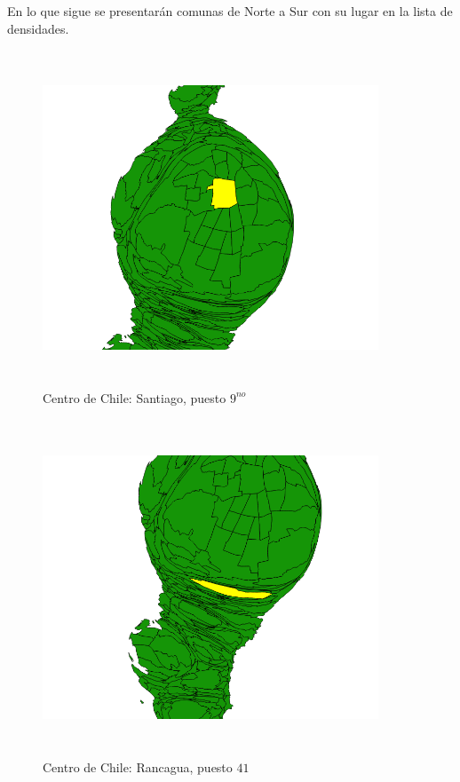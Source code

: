 \documentclass[20pt]{report}
\begin{document}
\begin{itemize}
En lo que sigue se presentar\'an comunas de Norte a Sur con su lugar en la lista de densidades.

\begin{figure}[H]
\begin{center}
\includegraphics[width=10cm, height=10cm]{santiago9.png}
\vspace{-0.5cm} %
\caption{Centro de Chile: Santiago, puesto $9^{no}$}
\label{Label para referencia}
\end{center}
\end{figure}

\begin{figure}[H]
\begin{center}
\includegraphics[width=10cm, height=10cm]{rancagua.png}
\vspace{-0.5cm} %
\caption{Centro de Chile: Rancagua, puesto $41$}
\label{Label para referencia}
\end{center}
\end{figure}


\end{itemize}
\end{document}

